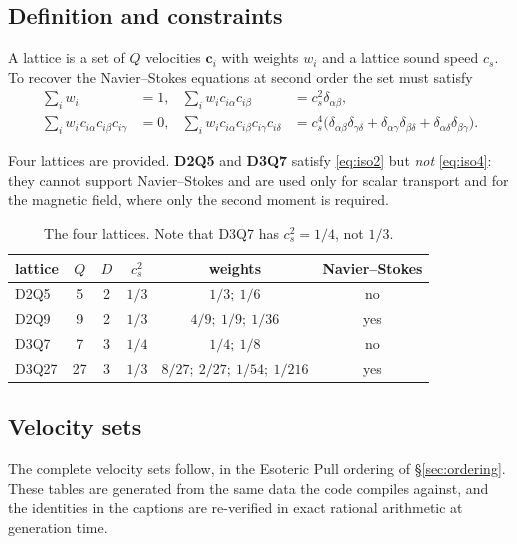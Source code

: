 \documentclass[11pt,a4paper]{article}
\newcommand{\cs}{c_s}
\newcommand{\ci}{\bm{c}_i}
\begin{document}
\subsection{Definition and constraints}

A lattice is a set of $Q$ velocities $\ci$ with weights $w_i$ and a lattice sound
speed $\cs$. To recover the Navier--Stokes equations at second order the set must
satisfy
\begin{align}
  \textstyle\sum_i w_i &= 1, &
  \textstyle\sum_i w_i c_{i\alpha} c_{i\beta} &= \cs^2\delta_{\alpha\beta},
  \label{eq:iso2}\\
  \textstyle\sum_i w_i c_{i\alpha} c_{i\beta} c_{i\gamma} &= 0, &
  \textstyle\sum_i w_i c_{i\alpha} c_{i\beta} c_{i\gamma} c_{i\delta}
    &= \cs^4\big(\delta_{\alpha\beta}\delta_{\gamma\delta}
      + \delta_{\alpha\gamma}\delta_{\beta\delta}
      + \delta_{\alpha\delta}\delta_{\beta\gamma}\big).
  \label{eq:iso4}
\end{align}

Four lattices are provided. \textbf{D2Q5} and \textbf{D3Q7} satisfy
\eqref{eq:iso2} but \emph{not} \eqref{eq:iso4}: they cannot support
Navier--Stokes and are used only for scalar transport and for the magnetic field,
where only the second moment is required.

\begin{table}[h]
\centering\small
\begin{tabular}{lccccc}
\toprule
lattice & $Q$ & $D$ & $\cs^2$ & weights & Navier--Stokes \\
\midrule
D2Q5  & 5  & 2 & $1/3$ & $1/3;\ 1/6$ & no \\
D2Q9  & 9  & 2 & $1/3$ & $4/9;\ 1/9;\ 1/36$ & yes \\
D3Q7  & 7  & 3 & $1/4$ & $1/4;\ 1/8$ & no \\
D3Q27 & 27 & 3 & $1/3$ & $8/27;\ 2/27;\ 1/54;\ 1/216$ & yes \\
\bottomrule
\end{tabular}
\caption{The four lattices. Note that D3Q7 has $\cs^2=1/4$, not $1/3$.}
\end{table}

\subsection{Velocity sets}
\label{sec:velsets}

The complete velocity sets follow, in the Esoteric Pull ordering of
\S\ref{sec:ordering}. These tables are generated from the same data the code
compiles against, and the identities in the captions are re-verified in exact
rational arithmetic at generation time.
\end{document}
